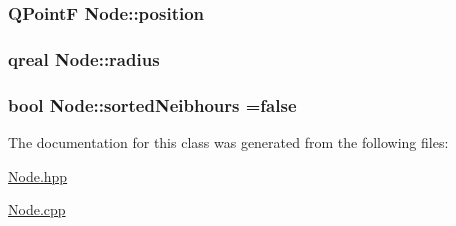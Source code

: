 \subsubsection[{position}]{\setlength{\rightskip}{0pt plus 5cm}Q\+Point\+F Node\+::position\hspace{0.3cm}{\ttfamily [protected]}}\label{class_node_af0201de36fd117a362e5f52fd6d75cde}
\hypertarget{class_node_abc1468f478d90c8d205b5753eacb1f3b}{}
\subsubsection[{radius}]{\setlength{\rightskip}{0pt plus 5cm}qreal Node\+::radius\hspace{0.3cm}{\ttfamily [protected]}}\label{class_node_abc1468f478d90c8d205b5753eacb1f3b}
\hypertarget{class_node_a39c984cfd740ca7968dc6a62c2b87570}{}
\subsubsection[{sorted\+Neibhours}]{\setlength{\rightskip}{0pt plus 5cm}bool Node\+::sorted\+Neibhours =false\hspace{0.3cm}{\ttfamily [protected]}}\label{class_node_a39c984cfd740ca7968dc6a62c2b87570}


The documentation for this class was generated from the following files\+:\begin{DoxyCompactItemize}
\item 
\hyperlink{_node_8hpp}{Node.\+hpp}\item 
\hyperlink{_node_8cpp}{Node.\+cpp}\end{DoxyCompactItemize}
